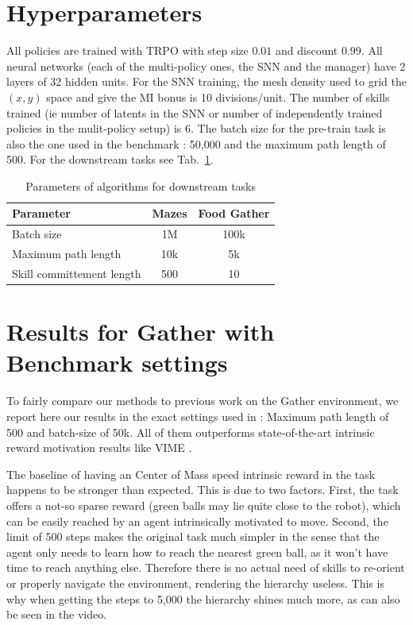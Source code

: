 \documentclass{article} %
\begin{document}



\appendix
\section{Hyperparameters}
\label{sec:hyper}
All policies are trained with TRPO with step size $0.01$ and discount $0.99$. All neural networks (each of the multi-policy ones, the SNN and the manager) have 2 layers of 32 hidden units. For the SNN training, the mesh density used to grid the $(x, y)$ space and give the MI bonus is 10 divisions/unit. The number of skills trained (ie number of latents in the SNN or number of independently trained policies in the mulit-policy setup) is 6. The batch size for the pre-train task is also the one used in the benchmark \citep{duan2016benchmarking}: 50,000 and the maximum path length of 500. For the downstream tasks see Tab.\ \ref{tab:params}.

\begin{table}[h!]
\centering
\begin{tabular}[t]{l|c|c}
Parameter & Mazes & Food Gather \\
\hline
Batch size & 1M & 100k \\
Maximum path length & 10k & 5k \\
Skill committement length & 500 & 10
\end{tabular}
\caption{Parameters of algorithms for downstream tasks}
\label{tab:params}
\end{table}


\section{Results for Gather with Benchmark settings}
To fairly compare our methods to previous work on the Gather environment, we report here our results in the exact settings used in \citet{duan2016benchmarking}: Maximum path length of 500 and batch-size of 50k. All of them outperforms state-of-the-art intrinsic reward motivation results like VIME \citep{houthooft2016variational}.

The baseline of having an Center of Mass speed intrinsic reward in the task happens to be stronger than expected. This is due to two factors. First, the task offers a not-so sparse reward (green balls may lie quite close to the robot), which can be easily reached by an agent intrinsically motivated to move. Second, the limit of 500 steps makes the original task much simpler in the sense that the agent only needs to learn how to reach the nearest green ball, as it won't have time to reach anything else. Therefore there is no actual need of skills to re-orient or properly navigate the environment, rendering the hierarchy useless. This is why when getting the steps to 5,000 the hierarchy shines much more, as can also be seen in the video.
\end{document}
